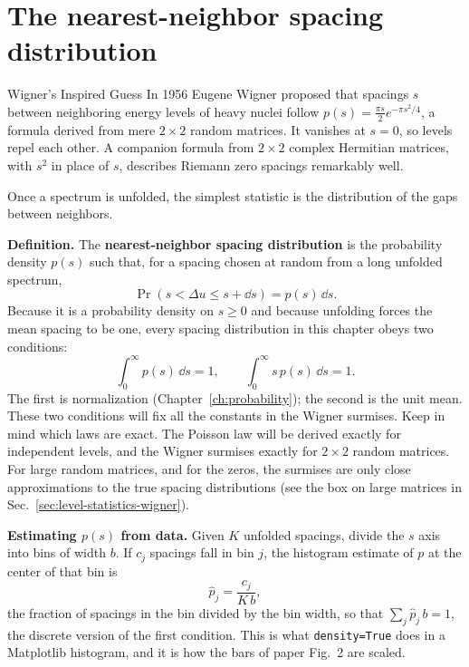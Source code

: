 \section{The nearest-neighbor spacing distribution}\label{sec:level-statistics-spacing}
\begin{didyouknow}{Wigner's Inspired Guess}
In 1956 Eugene Wigner proposed that spacings $s$ between neighboring energy levels of heavy nuclei follow $p(s)=\tfrac{\pi s}{2}e^{-\pi s^2/4}$, a formula derived from mere $2\times2$ random matrices. It vanishes at $s=0$, so levels repel each other. A companion formula from $2\times2$ complex Hermitian matrices, with $s^2$ in place of $s$, describes Riemann zero spacings remarkably well.
\end{didyouknow}

Once a spectrum is unfolded, the simplest statistic is the distribution of the gaps between neighbors.

\textbf{Definition.} The \textbf{nearest-neighbor spacing distribution} is the probability density $p(s)$ such that, for a spacing chosen at random from a long unfolded spectrum,
\begin{equation}
\Pr\left(s<\Delta u\le s+\dd s\right)=p(s)\,\dd s .
\label{eq:level-statistics-pdef}
\end{equation}
Because it is a probability density on $s\ge0$ and because unfolding forces the mean spacing to be one, every spacing distribution in this chapter obeys two conditions:
\begin{equation}
\int_0^\infty p(s)\,\dd s=1,\qquad \int_0^\infty s\,p(s)\,\dd s=1 .
\label{eq:level-statistics-twoconditions}
\end{equation}
The first is normalization (Chapter~\ref{ch:probability}); the second is the unit mean. These two conditions will fix all the constants in the Wigner surmises. Keep in mind which laws are exact. The Poisson law will be derived exactly for independent levels, and the Wigner surmises exactly for $2\times2$ random matrices. For large random matrices, and for the zeros, the surmises are only close approximations to the true spacing distributions (see the box on large matrices in Sec.~\ref{sec:level-statistics-wigner}).

\textbf{Estimating $p(s)$ from data.} Given $K$ unfolded spacings, divide the $s$ axis into bins of width $b$. If $c_j$ spacings fall in bin $j$, the histogram estimate of $p$ at the center of that bin is
\begin{equation}
\hat p_j=\frac{c_j}{K\,b},
\label{eq:level-statistics-hist}
\end{equation}
the fraction of spacings in the bin divided by the bin width, so that $\sum_j\hat p_j\,b=1$, the discrete version of the first condition. This is what \texttt{density=True} does in a Matplotlib histogram, and it is how the bars of paper Fig.~2 are scaled.

